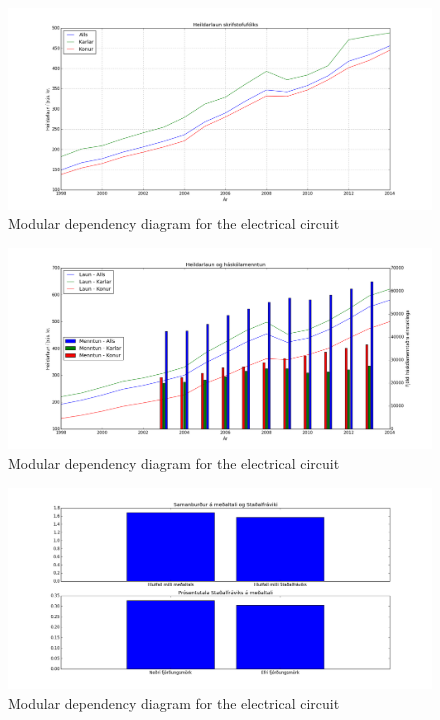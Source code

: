 \documentclass[12pt, svn, draft]{rureport}
\begin{document}
\begin{figure}
	\centering 
	\includegraphics[width=\textwidth]{../graphics/Heildar_laun.png}
	\caption{Modular dependency diagram for the electrical circuit \label{fig:heildarlaun}}
\end{figure}

\begin{figure}
	\centering 
	\includegraphics[width=\textwidth]{../graphics/Heildar_laun_og_haskolamentun.png}
	\caption{Modular dependency diagram for the electrical circuit \label{fig:heildarhask}}
\end{figure}

\begin{figure}
	\centering 
	\includegraphics[width=\textwidth]{../graphics/medaltal_stadalfravik_menntun_utan_innan_hs.png}
	\caption{Modular dependency diagram for the electrical circuit \label{fig:stdhs}}
\end{figure}
\end{document}
